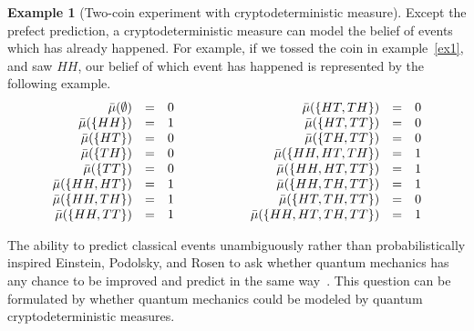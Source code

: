 \documentclass[12pt]{iopart}
\theoremstyle{plain}
\theoremstyle{definition}
\newtheorem{example}[thm]{Example}
\begin{document}
\begin{example}[Two-coin experiment with cryptodeterministic measure]\label{ex4}Except
the prefect prediction, a cryptodeterministic measure can model the
belief of events which has already happened. For example, if we tossed
the coin in example~\ref{ex1}, and saw $HH$, our belief of which
event has happened is represented by the following example.
\begin{equation}
\begin{array}{c@{\qquad\qquad}c}
\begin{array}{rcl}
\bar{\mu}(\emptyset) & = & 0\\
\bar{\mu}(\{HH\}) & = & 1\\
\bar{\mu}(\{HT\}) & = & 0\\
\bar{\mu}(\{TH\}) & = & 0\\
\bar{\mu}(\{TT\}) & = & 0\\
\bar{\mu}(\{HH,HT\}) & = & 1\\
\bar{\mu}(\{HH,TH\}) & = & 1\\
\bar{\mu}(\{HH,TT\}) & = & 1
\end{array} & \begin{array}{rcl}
\bar{\mu}(\{HT,TH\}) & = & 0\\
\bar{\mu}(\{HT,TT\}) & = & 0\\
\bar{\mu}(\{TH,TT\}) & = & 0\\
\bar{\mu}(\{HH,HT,TH\}) & = & 1\\
\bar{\mu}(\{HH,HT,TT\}) & = & 1\\
\bar{\mu}(\{HH,TH,TT\}) & = & 1\\
\bar{\mu}(\{HT,TH,TT\}) & = & 0\\
\bar{\mu}(\{HH,HT,TH,TT\}) & = & 1
\end{array}\end{array}
\end{equation}
\end{example}

\noindent The ability to predict classical events unambiguously rather
than probabilistically inspired Einstein, Podolsky, and Rosen to ask
whether quantum mechanics has any chance to be improved and predict
in the same way~\cite{EPR1935,peres1995quantum,544199,Mermin2007}.
This question can be formulated by whether quantum mechanics could
be modeled by quantum cryptodeterministic measures.
\end{document}
